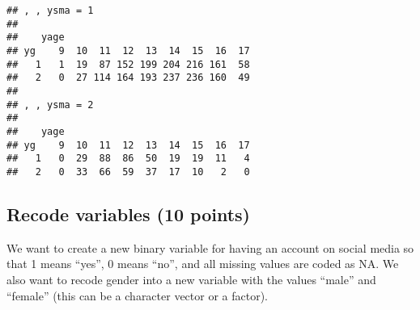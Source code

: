 \documentclass[
]{article}
\newenvironment{Shaded}{\begin{snugshade}}{\end{snugshade}}
\newcommand{\CommentTok}[1]{\textcolor[rgb]{0.56,0.35,0.01}{\textit{#1}}}
\newcommand{\DecValTok}[1]{\textcolor[rgb]{0.00,0.00,0.81}{#1}}
\newcommand{\KeywordTok}[1]{\textcolor[rgb]{0.13,0.29,0.53}{\textbf{#1}}}
\newcommand{\NormalTok}[1]{#1}
\newcommand{\OperatorTok}[1]{\textcolor[rgb]{0.81,0.36,0.00}{\textbf{#1}}}
\newcommand{\OtherTok}[1]{\textcolor[rgb]{0.56,0.35,0.01}{#1}}
\newcommand{\StringTok}[1]{\textcolor[rgb]{0.31,0.60,0.02}{#1}}
\begin{document}
\begin{Shaded}
\end{Shaded}

\begin{verbatim}
## , , ysma = 1
## 
##    yage
## yg    9  10  11  12  13  14  15  16  17
##   1   1  19  87 152 199 204 216 161  58
##   2   0  27 114 164 193 237 236 160  49
## 
## , , ysma = 2
## 
##    yage
## yg    9  10  11  12  13  14  15  16  17
##   1   0  29  88  86  50  19  19  11   4
##   2   0  33  66  59  37  17  10   2   0
\end{verbatim}

\hypertarget{recode-variables-10-points}{%
\subsection{Recode variables (10
points)}\label{recode-variables-10-points}}

We want to create a new binary variable for having an account on social
media so that 1 means ``yes'', 0 means ``no'', and all missing values
are coded as NA. We also want to recode gender into a new variable with
the values ``male'' and ``female'' (this can be a character vector or a
factor).

\begin{Shaded}
\end{Shaded}
\end{document}
